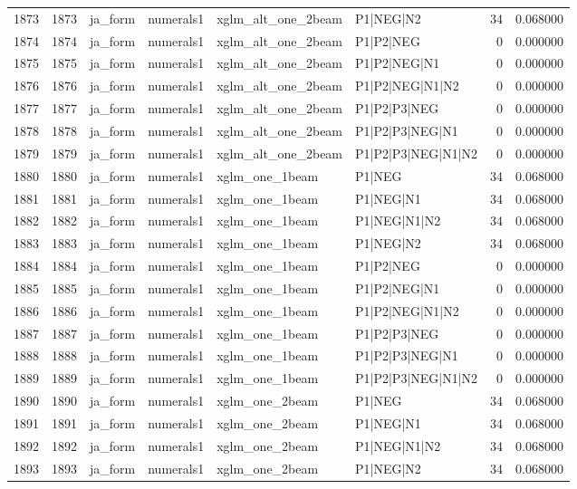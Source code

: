 \begin{tabular}{lrllllrr}
1873 & 1873 & ja_form & numerals1 & xglm_alt_one_2beam & P1|NEG|N2 & 34 & 0.068000 \\
1874 & 1874 & ja_form & numerals1 & xglm_alt_one_2beam & P1|P2|NEG & 0 & 0.000000 \\
1875 & 1875 & ja_form & numerals1 & xglm_alt_one_2beam & P1|P2|NEG|N1 & 0 & 0.000000 \\
1876 & 1876 & ja_form & numerals1 & xglm_alt_one_2beam & P1|P2|NEG|N1|N2 & 0 & 0.000000 \\
1877 & 1877 & ja_form & numerals1 & xglm_alt_one_2beam & P1|P2|P3|NEG & 0 & 0.000000 \\
1878 & 1878 & ja_form & numerals1 & xglm_alt_one_2beam & P1|P2|P3|NEG|N1 & 0 & 0.000000 \\
1879 & 1879 & ja_form & numerals1 & xglm_alt_one_2beam & P1|P2|P3|NEG|N1|N2 & 0 & 0.000000 \\
1880 & 1880 & ja_form & numerals1 & xglm_one_1beam & P1|NEG & 34 & 0.068000 \\
1881 & 1881 & ja_form & numerals1 & xglm_one_1beam & P1|NEG|N1 & 34 & 0.068000 \\
1882 & 1882 & ja_form & numerals1 & xglm_one_1beam & P1|NEG|N1|N2 & 34 & 0.068000 \\
1883 & 1883 & ja_form & numerals1 & xglm_one_1beam & P1|NEG|N2 & 34 & 0.068000 \\
1884 & 1884 & ja_form & numerals1 & xglm_one_1beam & P1|P2|NEG & 0 & 0.000000 \\
1885 & 1885 & ja_form & numerals1 & xglm_one_1beam & P1|P2|NEG|N1 & 0 & 0.000000 \\
1886 & 1886 & ja_form & numerals1 & xglm_one_1beam & P1|P2|NEG|N1|N2 & 0 & 0.000000 \\
1887 & 1887 & ja_form & numerals1 & xglm_one_1beam & P1|P2|P3|NEG & 0 & 0.000000 \\
1888 & 1888 & ja_form & numerals1 & xglm_one_1beam & P1|P2|P3|NEG|N1 & 0 & 0.000000 \\
1889 & 1889 & ja_form & numerals1 & xglm_one_1beam & P1|P2|P3|NEG|N1|N2 & 0 & 0.000000 \\
1890 & 1890 & ja_form & numerals1 & xglm_one_2beam & P1|NEG & 34 & 0.068000 \\
1891 & 1891 & ja_form & numerals1 & xglm_one_2beam & P1|NEG|N1 & 34 & 0.068000 \\
1892 & 1892 & ja_form & numerals1 & xglm_one_2beam & P1|NEG|N1|N2 & 34 & 0.068000 \\
1893 & 1893 & ja_form & numerals1 & xglm_one_2beam & P1|NEG|N2 & 34 & 0.068000 \\

\end{tabular}
